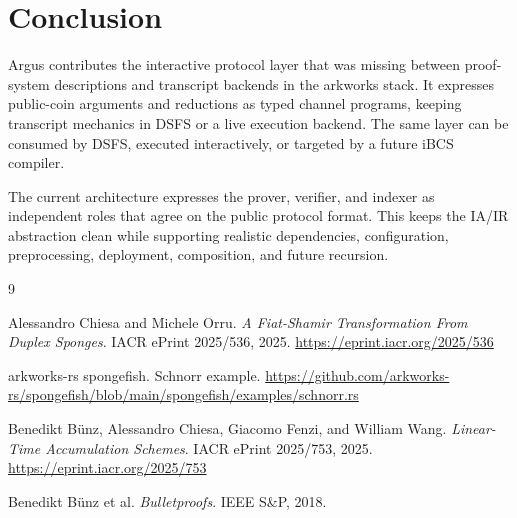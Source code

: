 \documentclass[11pt]{article}
\begin{document}
\section{Conclusion}

Argus contributes the interactive protocol layer that was missing between
proof-system descriptions and transcript backends in the arkworks stack. It
expresses public-coin arguments and reductions as typed channel programs,
keeping transcript mechanics in DSFS or a live execution backend. The same
layer can be consumed by DSFS, executed interactively, or targeted by a future
iBCS compiler.

The current architecture expresses the prover, verifier, and indexer as
independent roles that agree on the public protocol format. This keeps the
IA/IR abstraction clean while supporting realistic dependencies,
configuration, preprocessing, deployment, composition, and future recursion.

\begin{thebibliography}{9}

Alessandro Chiesa and Michele Orru.
\newblock \emph{A Fiat-Shamir Transformation From Duplex Sponges}.
\newblock IACR ePrint 2025/536, 2025.
\newblock \url{https://eprint.iacr.org/2025/536}

arkworks-rs spongefish.
\newblock Schnorr example.
\newblock \url{https://github.com/arkworks-rs/spongefish/blob/main/spongefish/examples/schnorr.rs}

Benedikt B\"unz, Alessandro Chiesa, Giacomo Fenzi, and William Wang.
\newblock \emph{Linear-Time Accumulation Schemes}.
\newblock IACR ePrint 2025/753, 2025.
\newblock \url{https://eprint.iacr.org/2025/753}

Benedikt B\"unz et al.
\newblock \emph{Bulletproofs}.
\newblock IEEE S\&P, 2018.

\end{thebibliography}
\end{document}
